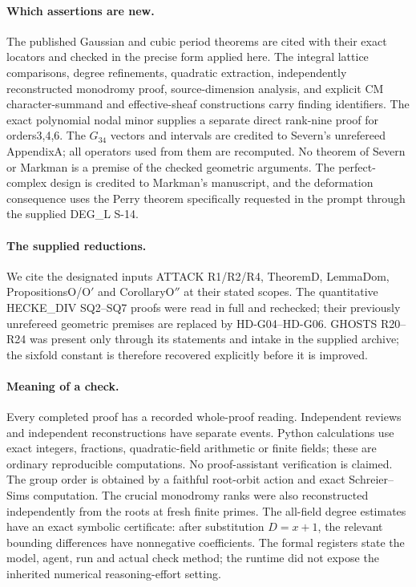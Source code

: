 \paragraph{Which assertions are new.}
The published Gaussian and cubic period theorems are cited with their
exact locators and checked in the precise form applied here. The
integral lattice comparisons, degree refinements, quadratic extraction,
independently reconstructed monodromy proof, source-dimension analysis,
and explicit CM character-summand and effective-sheaf constructions
carry finding identifiers.
The exact polynomial nodal minor supplies a separate direct rank-nine
proof for orders3,4,6. The $G_{34}$ vectors and intervals are credited
to Severn's unrefereed AppendixA; all operators used from them are
recomputed. No theorem of Severn or Markman is a premise of the
checked geometric arguments. The perfect-complex design is credited
to Markman's manuscript, and the deformation consequence uses the
Perry theorem specifically requested in the prompt through the supplied
DEG\_L S-14.

\paragraph{The supplied reductions.}
We cite the designated inputs ATTACK R1/R2/R4, TheoremD, LemmaDom,
PropositionsO/O$'$ and CorollaryO$''$ at their stated scopes.
The quantitative HECKE\_DIV SQ2--SQ7 proofs were read in full and
rechecked; their previously unrefereed geometric premises are replaced
by HD-G04--HD-G06. GHOSTS R20--R24 was present only through its
statements and intake in the supplied archive; the sixfold constant is
therefore recovered explicitly before it is improved.

\paragraph{Meaning of a check.}
Every completed proof has a recorded whole-proof reading. Independent
reviews and independent reconstructions have separate events. Python
calculations use exact integers, fractions, quadratic-field arithmetic
or finite fields; these are ordinary reproducible computations. No
proof-assistant verification is claimed. The group order is obtained
by a faithful root-orbit action and exact Schreier--Sims computation.
The crucial monodromy ranks were also reconstructed independently from
the roots at fresh finite primes. The all-field degree estimates have
an exact symbolic certificate: after substitution $D=x+1$, the
relevant bounding differences have nonnegative coefficients. The
formal registers state the model,
agent, run and actual check method; the runtime did not expose the
inherited numerical reasoning-effort setting.


